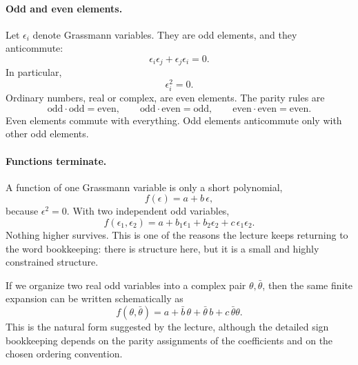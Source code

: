 \paragraph{Odd and even elements.}
Let \(\epsilon_i\) denote Grassmann variables. They are odd elements, and they anticommute:
\begin{equation}
\epsilon_i \epsilon_j + \epsilon_j \epsilon_i = 0.
\end{equation}
In particular,
\begin{equation}
\epsilon_i^2 = 0.
\end{equation}
Ordinary numbers, real or complex, are even elements. The parity rules are
\begin{equation}
\text{odd}\cdot\text{odd}=\text{even},
\qquad
\text{odd}\cdot\text{even}=\text{odd},
\qquad
\text{even}\cdot\text{even}=\text{even}.
\end{equation}
Even elements commute with everything. Odd elements anticommute only with other odd elements.

\paragraph{Functions terminate.}
A function of one Grassmann variable is only a short polynomial,
\begin{equation}
f(\epsilon)=a+b\,\epsilon,
\end{equation}
because \(\epsilon^2=0\). With two independent odd variables,
\begin{equation}
f(\epsilon_1,\epsilon_2)=a+b_1\epsilon_1+b_2\epsilon_2+c\,\epsilon_1\epsilon_2.
\end{equation}
Nothing higher survives. This is one of the reasons the lecture keeps returning to the word bookkeeping: there is structure here, but it is a small and highly constrained structure.

If we organize two real odd variables into a complex pair \(\theta,\bar\theta\), then the same finite expansion can be written schematically as
\begin{equation}
f(\theta,\bar\theta)=a+\bar b\,\theta+\bar\theta\,b+c\,\bar\theta\theta.
\end{equation}
This is the natural form suggested by the lecture, although the detailed sign bookkeeping depends on the parity assignments of the coefficients and on the chosen ordering convention.

